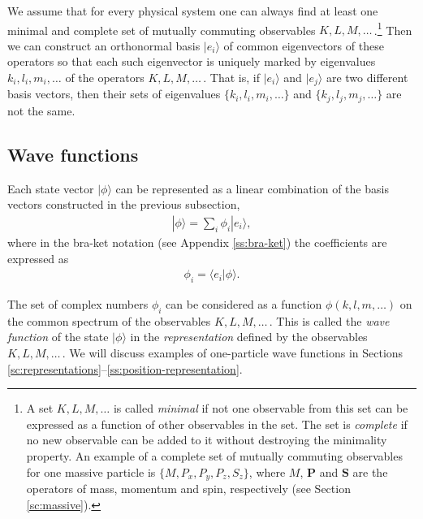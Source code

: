 \documentclass[nochecklpage]{stefan1}
\theoremstyle{definition}
\begin{document}
We assume that for every physical system one can always find at least
one minimal and complete set of mutually commuting observables
$ K, L, M, \ldots $\,.\footnote{A set $ K, L, M, \ldots $ is called
\emph{minimal} if not one observable from this set can be expressed as a
function of other observables in the set. The set is \emph{complete} if no
new observable can be added to it without destroying the minimality
property. An example of a complete set of mutually commuting observables
for one massive particle is $ \{M, P_{x}, P_{y}, P_{z}, S_{z} \} $,
where $M$, $\boldsymbol{P}$ and $ \boldsymbol{S} $ are the operators of
mass, momentum and spin, respectively (see Section \ref{sc:massive}).}
Then we can construct an orthonormal basis $ |e_{i} \rangle $ of common
eigenvectors of these operators so that each such eigenvector is
uniquely marked by eigenvalues $ k_{i}, l_{i}, m_{i}, \ldots $ of the
operators $ K, L, M, \ldots $\,. That is, if $ | e_{i} \rangle $ and
$ | e_{j} \rangle $ are two different basis vectors, then their sets of
eigenvalues $ \{k_{i}, l_{i}, m_{i}, \ldots \} $ and $ \{k_{j}, l_{j},
m_{j}, \ldots \} $ are not the same.

\subsection{Wave functions}\label{ss:wave_function}
Each state vector $ | \phi \rangle $ can be represented as a linear
combination of the basis vectors constructed in the previous subsection,
%
\begin{align}
| \phi \rangle = \sum_{i} \phi_{i}
|e_{i} \rangle , \label{eq:(4.33)}
\end{align}
%
where in the bra-ket notation (see Appendix \ref{ss:bra-ket}) the
coefficients are expressed as
%
\begin{align}
\phi_{i} = \langle e_{i} | \phi \rangle . \label{eq:(4.33a)}
\end{align}

The set of complex numbers $ \phi_{i} $ can be considered as a function
$ \phi (k, l, m, \ldots ) $ on the common spectrum of the observables
$ K, L, M, \ldots $\,. This is called the \emph{wave function}
of the state $ | \phi \rangle $ in the
\emph{representation} defined by the observables $ K, L, M, \ldots $\,. We will
discuss examples of one-particle wave functions in Sections
\ref{sc:representations}--\ref{ss:position-representation}.

\end{document}
